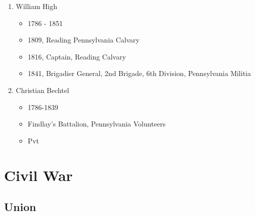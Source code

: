 \documentclass[11pt,letter]{book}
\begin{document}
\begin{enumerate}
\item William High
\begin{itemize}
\item 1786 - 1851
\item 1809, Reading Pennsylvania Calvary 
\item 1816, Captain, Reading Calvary 
\item 1841, Brigadier General, 2nd Brigade, 6th Division, Pennsylvania Militia 
\end{itemize}

\item Christian Bechtel
\begin{itemize}
\item 1786-1839
\item Findlay's Battalion, Pennsylvania Volunteers 
\item Pvt
\end{itemize}
\end{enumerate}


\chapter{Civil War}

\section{Union}
\end{document}
